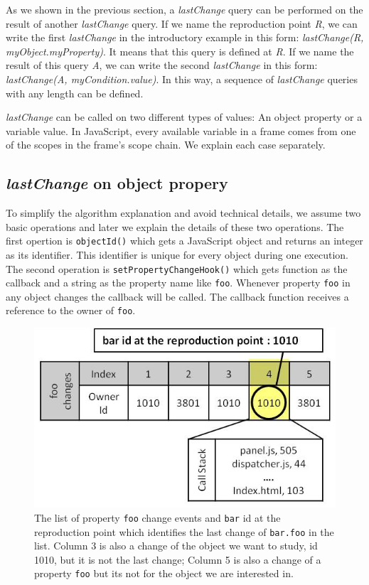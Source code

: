\documentclass[preprint]{sigplanconf}
\begin{document}
As we shown in the previous section, a \textit{lastChange} query can be performed on the result of another \textit{lastChange} query. If we name the reproduction point \textit{R}, we can write the first \textit{lastChange} in the introductory example in this form: \textit{lastChange(R, myObject.myProperty)}. It means that this query is defined at \textit{R}. If we name the result of this query \textit{A}, we can write the second \textit{lastChange} in this form: \textit{lastChange(A, myCondition.value)}. In this way, a sequence of \textit{lastChange} queries with any length can be defined.

\textit{lastChange} can be called on two different types of values: An object property or a variable value. In JavaScript, every available variable in a frame comes from one of the scopes in the frame's scope chain. We explain each case separately.

\subsection{\textit{lastChange} on object propery}
To simplify the algorithm explanation and avoid technical details, we assume two basic operations and later we explain the details of these two operations. The first opertion is \texttt{objectId()} which gets a JavaScript object and returns an integer as its identifier. This identifier is unique for every object during one execution. The second operation is \texttt{setPropertyChangeHook()} which gets function as the callback and a string as the property name like \texttt{foo}. Whenever property \texttt{foo} in any object changes the callback will be called. The callback function receives a reference to the owner of \texttt{foo}.


\begin{figure}[htp]
\includegraphics[width=.48\textwidth]{6-foo-changes1.jpg}
\caption{The list of property \texttt{foo} change events and \texttt{bar} id at the reproduction point which identifies the last change of \texttt{bar.foo} in the list. Column 3 is also a change of the object we want to study, id 1010, but it is not the last change; Column 5 is also a change of a property \texttt{foo} but its not for the object we are interested in.}
\label{fig:foo-changes1}
\end{figure}
\end{document}
